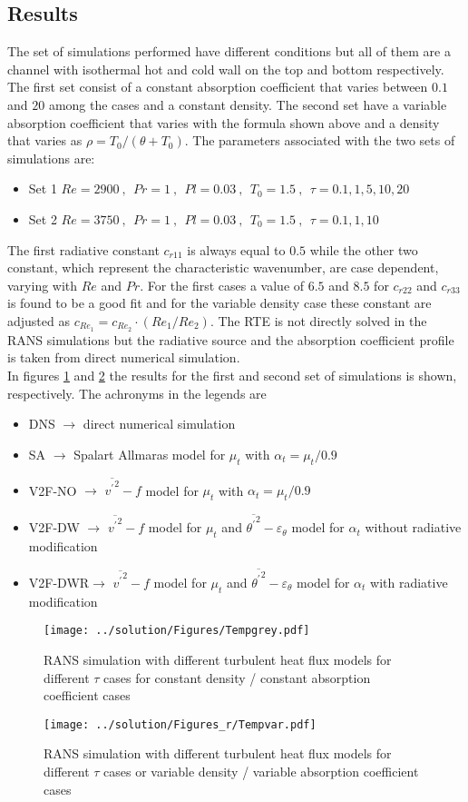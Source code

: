 \documentclass[10pt]{article}
\def\tp{\overline{{\theta^\prime}^2}}
\def\et{{\varepsilon_{\theta}}}
\begin{document}
\subsection*{Results}
The set of simulations performed have different conditions but all of them are a channel with isothermal hot and cold wall on the top and bottom respectively. The first set consist of a constant absorption coefficient that varies between $0.1$ and $20$ among the cases and a constant density. The second set have a variable absorption coefficient that varies with the formula shown above and a density that varies as $\rho = T_0/(\theta+T_0)$. The parameters associated with the two sets of simulations are:
\begin{itemize}
\item Set 1 $Re = 2900 \ , \ \ Pr = 1 \ , \ \ Pl = 0.03 \ , \ \ T_0 = 1.5 \ , \ \ \tau = 0.1,1,5,10,20$
\item Set 2 $Re = 3750 \ , \ \ Pr = 1 \ , \ \ Pl = 0.03 \ , \ \ T_0 = 1.5 \ , \ \ \tau = 0.1,1,10$
\end{itemize}
The first radiative constant $c_{r11}$ is always equal to $0.5$ while the other two constant, which represent the characteristic wavenumber, are case dependent, varying with $Re$ and $Pr$. For the first cases a value of $6.5$ and $8.5$ for $c_{r22}$ and $c_{r33}$ is found to be a good fit and for the variable density case these constant are adjusted as $c_{Re_1} = c_{Re_2} \cdot (Re_1/Re_2)$. The RTE is not directly solved in the RANS simulations but the radiative source and the absorption coefficient profile is taken from direct numerical simulation.\\ 
In figures \ref{constk} and \ref{vark} the results for the first and second set of simulations is shown, respectively. The achronyms in the legends are 
\begin{itemize}
\item DNS    $\rightarrow$ direct numerical simulation 
\item SA     $\rightarrow$ Spalart Allmaras model for $\mu_t$ with $\alpha_{t} = \mu_t / 0.9$
\item V2F-NO $\rightarrow$ $\overline{{v^\prime}^2} - f$ model for $\mu_t$ with $\alpha_{t} = \mu_t / 0.9$
\item V2F-DW $\rightarrow$ $\overline{{v^\prime}^2} - f$ model for $\mu_t$ and $\tp - \et$ model for $\alpha_t$ without radiative modification
\item V2F-DWR$\rightarrow$ $\overline{{v^\prime}^2} - f$ model for $\mu_t$ and $\tp - \et$ model for $\alpha_t$ with radiative modification
\end{itemize}
\begin{figure}[h]
\hspace{-3.5em}
\texttt{[image: ../solution/Figures/Tempgrey.pdf]}
\caption{\noindent RANS simulation with different turbulent heat flux models for different $\tau$ cases for constant density / constant absorption coefficient cases}
\label{constk}
\end{figure}

\begin{figure}[h]
\hspace{-3.5em}
\texttt{[image: ../solution/Figures\_r/Tempvar.pdf]}
\caption{\noindent RANS simulation with different turbulent heat flux models for different $\tau$ cases or variable density / variable absorption coefficient cases}
\label{vark}
\end{figure}
\end{document}
